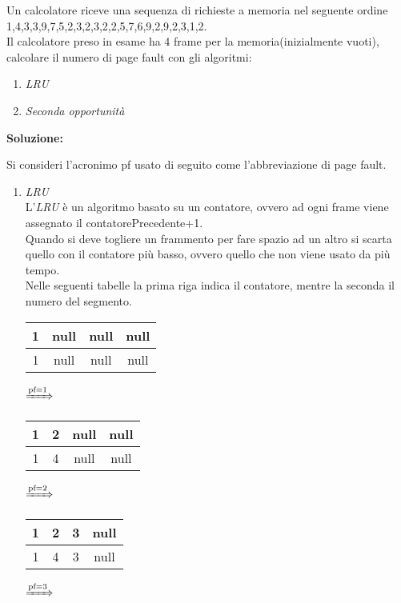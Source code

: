 \documentclass{article}
\begin{document}
   Un calcolatore riceve una sequenza di richieste a memoria nel seguente ordine 1,4,3,3,9,7,5,2,3,2,3,2,2,5,7,6,9,2,9,2,3,1,2.\\
   Il calcolatore preso in esame ha 4 frame per la memoria(inizialmente vuoti), calcolare il numero di page fault con gli algoritmi:
   \begin{enumerate}
      \item \emph{LRU}
      \item \emph{Seconda opportunità}
   \end{enumerate}
   \textbf{Soluzione:}


   Si consideri l'acronimo pf usato di seguito come l'abbreviazione di page fault.
   \begin{enumerate}
      \item \emph{LRU}\\
         L'\emph{LRU} è un algoritmo basato su un contatore, ovvero ad ogni frame viene assegnato il contatorePrecedente+1.\\
         Quando si deve togliere un frammento per fare spazio ad un altro si scarta quello con il contatore più basso, ovvero quello che non viene usato da più tempo.\\
         Nelle seguenti tabelle la prima riga indica il contatore, mentre la seconda il numero del segmento.\\
         \begin{tabular}{|c|c|c|c|}
            \hline
            1 & null & null &null\\
            \hline
            1 & null & null & null\\
            \hline
         \end{tabular}
         $\xRightarrow{\text{pf}=1}$
         \begin{tabular}{|c|c|c|c|}
            \hline
            1 & 2 & null &null\\
            \hline
            1 & 4 & null & null\\
            \hline
         \end{tabular}
         $\xRightarrow{\text{pf}=2}$
         \begin{tabular}{|c|c|c|c|}
            \hline
            1 & 2 & 3 &null\\
            \hline
            1 & 4 & 3 & null\\
            \hline
         \end{tabular}
         $\xRightarrow{\text{pf}=3}$
         \begin{tabular}{|c|c|c|c|}

\end{tabular}
\end{enumerate}
\end{document}
